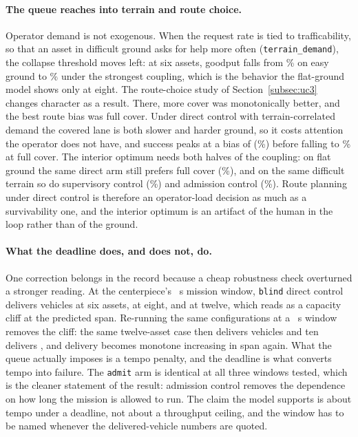 \documentclass[11pt]{article}
\begin{document}
\paragraph{The queue reaches into terrain and route choice.} Operator demand is not exogenous. When the request rate is tied to trafficability, so that an asset in difficult ground asks for help more often (\texttt{terrain\_demand}), the collapse threshold moves left: at six assets, goodput falls from \qTerrainFlatSix\% on easy ground to \qTerrainHardSix\% under the strongest coupling, which is the behavior the flat-ground model shows only at eight. The route-choice study of Section~\ref{subsec:uc3} changes character as a result. There, more cover was monotonically better, and the best route bias was full cover. Under direct control with terrain-correlated demand the covered lane is both slower and harder ground, so it costs attention the operator does not have, and success peaks at a bias of \qRouteDirectArgmax{} (\qRouteDirectBest\%) before falling to \qRouteDirectFull\% at full cover. The interior optimum needs both halves of the coupling: on flat ground the same direct arm still prefers full cover (\qRouteFlatFull\%), and on the same difficult terrain so do supervisory control (\qRouteSupFull\%) and admission control (\qRouteAdmFull\%). Route planning under direct control is therefore an operator-load decision as much as a survivability one, and the interior optimum is an artifact of the human in the loop rather than of the ground.

\paragraph{What the deadline does, and does not, do.} One correction belongs in the record because a cheap robustness check overturned a stronger reading. At the centerpiece's \qDeadline{}~s mission window, \texttt{blind} direct control delivers \qArrivedSix{} vehicles at six assets, \qArrivedEight{} at eight, and \qArrivedTwelve{} at twelve, which reads as a capacity cliff at the predicted span. Re-running the same configurations at a \qLongWindow{}~s window removes the cliff: the same twelve-asset case then delivers \qArrivedTwelveLong{} vehicles and ten delivers \qArrivedTenLong{}, and delivery becomes monotone increasing in span again. What the queue actually imposes is a tempo penalty, and the deadline is what converts tempo into failure. The \texttt{admit} arm is identical at all three windows tested, which is the cleaner statement of the result: admission control removes the dependence on how long the mission is allowed to run. The claim the model supports is about tempo under a deadline, not about a throughput ceiling, and the window has to be named whenever the delivered-vehicle numbers are quoted.
\end{document}
